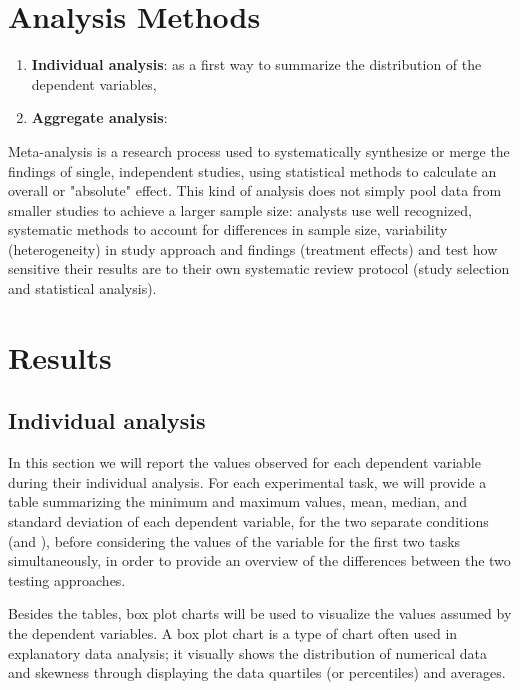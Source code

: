 \section{Analysis Methods}
\begin{enumerate}
    \item \textbf{Individual analysis}: as a first way to summarize the distribution of the dependent variables, 
    \item \textbf{Aggregate analysis}:
\end{enumerate}
Meta-analysis is a research process used to systematically synthesize or merge the findings of single, independent studies, using statistical methods to calculate an overall or "absolute" effect. This kind of analysis does not simply pool data from smaller studies to achieve a larger sample size: analysts use well recognized, systematic methods to account for differences in sample size, variability (heterogeneity) in study approach and findings (treatment effects) and test how sensitive their results are to their own systematic review protocol (study selection and statistical analysis).




\section{Results}
\subsection{Individual analysis}
In this section we will report the values observed for each dependent variable during their individual analysis. For each experimental task, we will provide a table summarizing the minimum and maximum values, mean, median, and standard deviation of each dependent variable, for the two separate conditions (\ie \tdd and \notdd), before considering the values of the variable for the first two tasks simultaneously, in order to provide an overview of the differences between the two testing approaches.

Besides the tables, box plot charts will be used to visualize the values assumed by the dependent variables.
A box plot chart is a type of chart often used in explanatory data analysis; it visually shows the distribution of numerical data and skewness through displaying the data quartiles (or percentiles) and averages.

